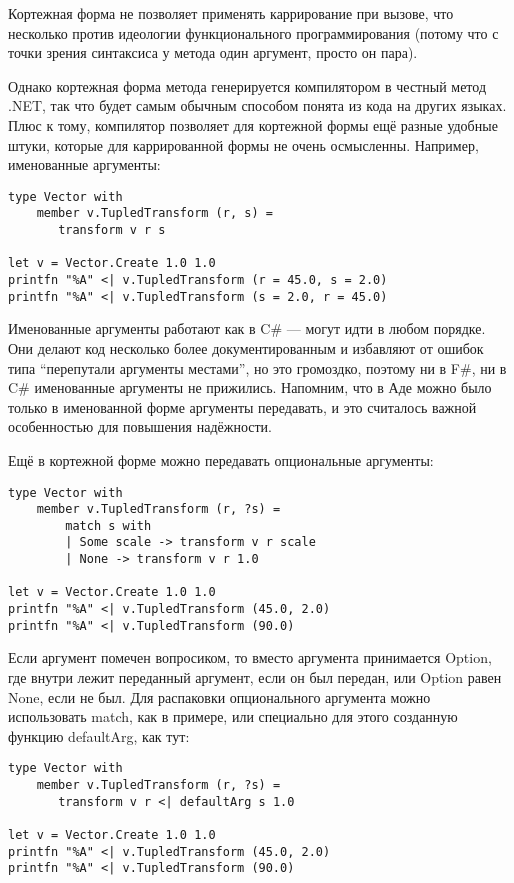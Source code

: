 \documentclass{../../text-style}
\begin{document}
Кортежная форма не позволяет применять каррирование при вызове, что несколько против идеологии функционального программирования (потому что с точки зрения синтаксиса у метода один аргумент, просто он пара).

Однако кортежная форма метода генерируется компилятором в честный метод .NET, так что будет самым обычным способом понята из кода на других языках.
Плюс к тому, компилятор позволяет для кортежной формы ещё разные удобные штуки, которые для каррированной формы не очень осмысленны.
Например, именованные аргументы:

\begin{verbatim}
type Vector with
    member v.TupledTransform (r, s) = 
       transform v r s

let v = Vector.Create 1.0 1.0
printfn "%A" <| v.TupledTransform (r = 45.0, s = 2.0)
printfn "%A" <| v.TupledTransform (s = 2.0, r = 45.0)
\end{verbatim}

Именованные аргументы работают как в C\# --- могут идти в любом порядке. 
Они делают код несколько более документированным и избавляют от ошибок типа \enquote{перепутали аргументы местами}, но это громоздко, поэтому ни в F\#, ни в C\# именованные аргументы не прижились.
Напомним, что в Аде можно было только в именованной форме аргументы передавать, и это считалось важной особенностью для повышения надёжности.

Ещё в кортежной форме можно передавать опциональные аргументы:

\begin{verbatim}
type Vector with
    member v.TupledTransform (r, ?s) = 
        match s with
        | Some scale -> transform v r scale
        | None -> transform v r 1.0

let v = Vector.Create 1.0 1.0
printfn "%A" <| v.TupledTransform (45.0, 2.0)
printfn "%A" <| v.TupledTransform (90.0)
\end{verbatim}

Если аргумент помечен вопросиком, то вместо аргумента принимается Option, где внутри лежит переданный аргумент, если он был передан, или Option равен None, если не был.
Для распаковки опционального аргумента можно использовать match, как в примере, или специально для этого созданную функцию defaultArg, как тут:

\begin{verbatim}
type Vector with
    member v.TupledTransform (r, ?s) = 
       transform v r <| defaultArg s 1.0

let v = Vector.Create 1.0 1.0
printfn "%A" <| v.TupledTransform (45.0, 2.0)
printfn "%A" <| v.TupledTransform (90.0)
\end{verbatim}
\end{document}
